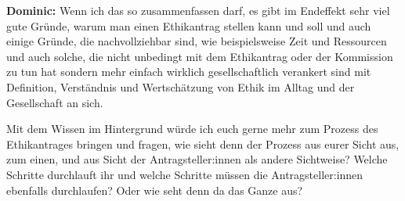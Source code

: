 \documentclass[a4paper,12pt,twoside]{scrreprt}
\begin{document}
\textbf{Dominic:} Wenn ich das so zusammenfassen darf, es gibt im Endeffekt sehr viel gute Gründe, warum man einen Ethikantrag stellen kann und soll und auch einige Gründe, die nachvollziehbar sind, wie beispielsweise Zeit und Ressourcen und auch solche, die nicht unbedingt mit dem Ethikantrag oder der Kommission zu tun hat sondern mehr einfach wirklich gesellschaftlich verankert sind mit Definition, Verständnis und Wertschätzung von Ethik im Alltag und der Gesellschaft an sich.

Mit dem Wissen im Hintergrund würde ich euch gerne mehr zum Prozess des Ethikantrages bringen und fragen, wie sieht denn der Prozess aus eurer Sicht aus, zum einen, und aus Sicht der Antragsteller:innen als andere Sichtweise? Welche Schritte durchlauft ihr und welche Schritte müssen die Antragsteller:innen ebenfalls durchlaufen? Oder wie seht denn da das Ganze aus?
\end{document}
